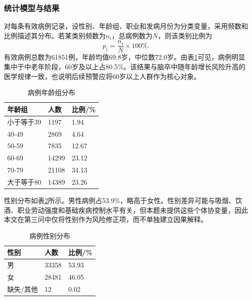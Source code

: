 \documentclass[UTF8,a4paper,12pt]{ctexart}
\begin{document}
\subsubsection{统计模型与结果}
对每条有效病例记录，设性别、年龄组、职业和发病月份为分类变量，采用频数和比例描述其分布。若某类别频数为$n_i$，总病例数为$N$，则该类别比例为
\begin{equation}
p_i=\frac{n_i}{N}\times 100\% .
\end{equation}
有效病例总数为61851例，年龄均值69.8岁，中位数72.0岁。由表\ref{tab:age}可见，病例明显集中于中老年阶段，60岁及以上占80.5\%。该结果与脑卒中随年龄增长风险升高的医学规律一致，也说明后续预警应将60岁以上人群作为核心对象。
\begin{table}[H]\centering\caption{病例年龄组分布}\label{tab:age}
\begin{tabular}{lll}
\toprule
年龄组 & 人数 & 比例/\% \\
\midrule
小于等于39 & 1197 & 1.94 \\
40-49 & 2869 & 4.64 \\
50-59 & 7835 & 12.67 \\
60-69 & 14299 & 23.12 \\
70-79 & 21108 & 34.13 \\
大于等于80 & 14389 & 23.26 \\
\bottomrule
\end{tabular}
\end{table}

性别分布如表\ref{tab:sex}所示。男性病例占53.9\%，略高于女性。性别差异可能与吸烟、饮酒、职业劳动强度和基础疾病控制水平有关，但本题未提供这些个体协变量，因此本文在第三问中仅将性别作为风险修正项，而不单独建立因果解释。
\begin{table}[H]\centering\caption{病例性别分布}\label{tab:sex}
\begin{tabular}{lll}
\toprule
性别 & 人数 & 比例/\% \\
\midrule
男 & 33358 & 53.93 \\
女 & 28481 & 46.05 \\
缺失/其他 & 12 & 0.02 \\
\bottomrule
\end{tabular}
\end{table}
\end{document}
